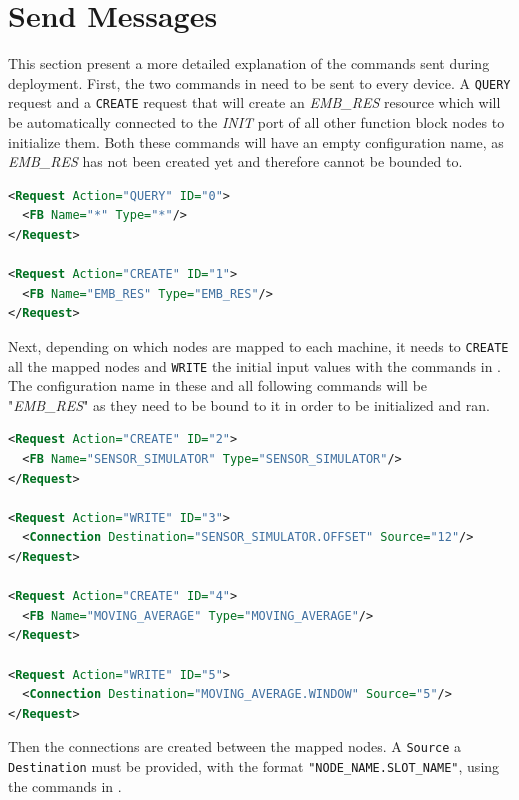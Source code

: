 \section{Send Messages} \label{app:send-messages}
This section present a more detailed explanation of the commands sent during deployment.
First, the two commands in  need to be sent to every device. A \texttt{QUERY} request and a \texttt{CREATE} request that will create an \textit{EMB\_RES} resource which will be automatically connected to the \textit{INIT} port of all other function block nodes to initialize them. Both these commands will have an empty configuration name, as \textit{EMB\_RES} has not been created yet and therefore cannot be bounded to.

\begin{lstlisting}[language=XML, caption={Setup deployment commands}, label={lst:deploy-setup}]
<Request Action="QUERY" ID="0">
  <FB Name="*" Type="*"/>
</Request>

<Request Action="CREATE" ID="1">
  <FB Name="EMB_RES" Type="EMB_RES"/>
</Request>
\end{lstlisting}

Next, depending on which nodes are mapped to each machine, it needs to \texttt{CREATE} all the mapped nodes and \texttt{WRITE} the initial input values with the commands in . The configuration name in these and all following commands will be "\textit{EMB\_RES}" as they need to be bound to it in order to be initialized and ran.

\begin{lstlisting}[language=XML, caption={\texttt{CREATE} nodes deployment commands}, label={lst:deploy-create-nodes}]
<Request Action="CREATE" ID="2">
  <FB Name="SENSOR_SIMULATOR" Type="SENSOR_SIMULATOR"/>
</Request>

<Request Action="WRITE" ID="3">
  <Connection Destination="SENSOR_SIMULATOR.OFFSET" Source="12"/>
</Request>

<Request Action="CREATE" ID="4">
  <FB Name="MOVING_AVERAGE" Type="MOVING_AVERAGE"/>
</Request>

<Request Action="WRITE" ID="5">
  <Connection Destination="MOVING_AVERAGE.WINDOW" Source="5"/>
</Request>
\end{lstlisting}

Then the connections are created between the mapped nodes. A \texttt{Source} a \texttt{Destination} must be provided, with the format \texttt{"NODE\_NAME.SLOT\_NAME"}, using the commands in .

